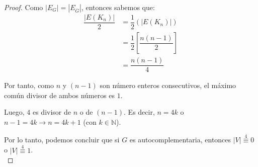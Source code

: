 \documentclass{article}
\begin{document}
\begin{enumerate}
\begin{enumerate}
\begin{proof}
        Como $|E_{G}| = |E_{\overline{G}}|$, entonces sabemos que:
        \begin{align*}
          \dfrac{|E(K_{n})|}{2}
          & = \dfrac{1}{2} (|E(K_{n})|) \\
          & = \dfrac{1}{2} \left[\dfrac{n(n - 1)}{2} \right] \\
          & = \dfrac{n(n - 1)}{4}
        \end{align*}

        Por tanto, como $n$ y $(n - 1)$ son número enteros consecutivos, el máximo común divisor de ambos números es $1$.

        Luego, $4$ es divisor de $n$ o de $(n -1)$. Es decir, $n = 4k$ o $n - 1 = 4k \longrightarrow n = 4k + 1$ (con $k \in \mathbb{N}$).

        Por lo tanto, podemos concluir que si $G$ es autocomplementaria, entonces $|V| \stackrel{4}{\equiv} 0$ o $|V| \stackrel{4}{\equiv} 1$. \\
      \end{proof}
    \end{enumerate}
\end{enumerate}
\end{document}
